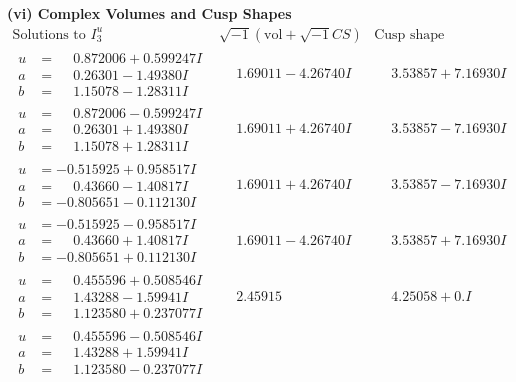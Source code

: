 \documentclass[1p]{elsarticle_modified}
\theoremstyle{definition}
\newcommand{\I}{\sqrt{-1}}
\begin{document}
\newpage\flushleft \textbf{(vi) Complex Volumes and Cusp Shapes}
$$\begin{array}{c|c|c}  
\text{Solutions to }I^u_{3}& \I (\text{vol} + \sqrt{-1}CS) & \text{Cusp shape}\\
 \hline 
\begin{aligned}
u &= \phantom{-}0.872006 + 0.599247 I \\
a &= \phantom{-}0.26301 - 1.49380 I \\
b &= \phantom{-}1.15078 - 1.28311 I\end{aligned}
 & \phantom{-}1.69011 - 4.26740 I & \phantom{-}3.53857 + 7.16930 I \\ \hline\begin{aligned}
u &= \phantom{-}0.872006 - 0.599247 I \\
a &= \phantom{-}0.26301 + 1.49380 I \\
b &= \phantom{-}1.15078 + 1.28311 I\end{aligned}
 & \phantom{-}1.69011 + 4.26740 I & \phantom{-}3.53857 - 7.16930 I \\ \hline\begin{aligned}
u &= -0.515925 + 0.958517 I \\
a &= \phantom{-}0.43660 - 1.40817 I \\
b &= -0.805651 - 0.112130 I\end{aligned}
 & \phantom{-}1.69011 + 4.26740 I & \phantom{-}3.53857 - 7.16930 I \\ \hline\begin{aligned}
u &= -0.515925 - 0.958517 I \\
a &= \phantom{-}0.43660 + 1.40817 I \\
b &= -0.805651 + 0.112130 I\end{aligned}
 & \phantom{-}1.69011 - 4.26740 I & \phantom{-}3.53857 + 7.16930 I \\ \hline\begin{aligned}
u &= \phantom{-}0.455596 + 0.508546 I \\
a &= \phantom{-}1.43288 - 1.59941 I \\
b &= \phantom{-}1.123580 + 0.237077 I\end{aligned}
 & \phantom{-}2.45915\phantom{ +0.000000I} & \phantom{-}4.25058 + 0. I\phantom{ +0.000000I} \\ \hline\begin{aligned}
u &= \phantom{-}0.455596 - 0.508546 I \\
a &= \phantom{-}1.43288 + 1.59941 I \\
b &= \phantom{-}1.123580 - 0.237077 I\end{aligned}

\end{array}$$
\end{document}
